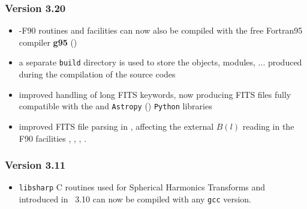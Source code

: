 \documentclass[12pt,twoside]{article}
\newcommand{\compresslist}{%
\setlength{\itemsep}{0ex}}{}
\begin{document}
{%

\subsubsection{Version 3.20}
\begin{itemize}\compresslist
	\item \healpixns-F90 routines and facilities can now also be compiled with
the free Fortran95 compiler \textbf{g95} ()
 	\item a separate {\tt build} directory is used to store the objects,
modules, ... produced during the compilation of the source codes
	\item improved handling of long FITS keywords, now producing FITS files
fully compatible with the
and 
{\tt Astropy} ()
{\tt Python} libraries
	\item improved FITS file parsing in 
,
affecting the external $B(l)$ reading in the F90 facilities 
, 
, 
, 
.
\end{itemize}

\subsubsection{Version 3.11}
\begin{itemize}\compresslist
	\item {\tt libsharp} C routines used for Spherical Harmonics Transforms 
and introduced in \healpix\ 3.10
can now be compiled with any {\tt gcc} version.
\end{itemize}

}
\end{document}
